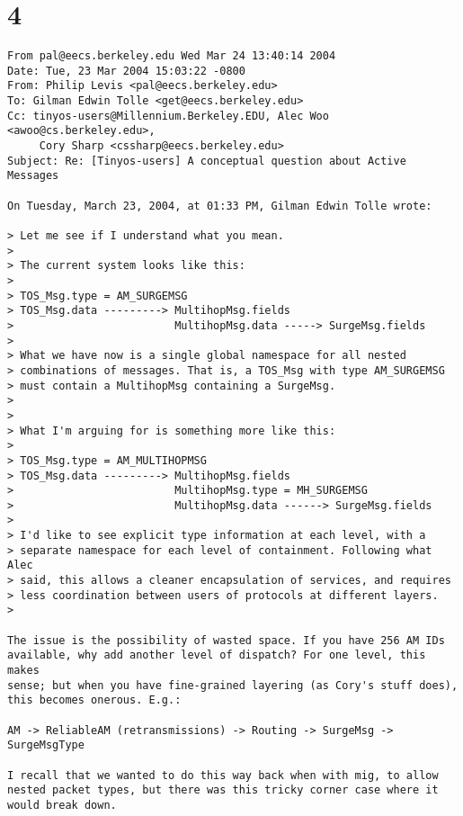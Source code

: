 \documentclass[10pt]{article}
\begin{document}
\section*{4}

\begin{verbatim}
From pal@eecs.berkeley.edu Wed Mar 24 13:40:14 2004
Date: Tue, 23 Mar 2004 15:03:22 -0800
From: Philip Levis <pal@eecs.berkeley.edu>
To: Gilman Edwin Tolle <get@eecs.berkeley.edu>
Cc: tinyos-users@Millennium.Berkeley.EDU, Alec Woo <awoo@cs.berkeley.edu>,
     Cory Sharp <cssharp@eecs.berkeley.edu>
Subject: Re: [Tinyos-users] A conceptual question about Active Messages

On Tuesday, March 23, 2004, at 01:33 PM, Gilman Edwin Tolle wrote:

> Let me see if I understand what you mean.
>
> The current system looks like this:
>
> TOS_Msg.type = AM_SURGEMSG
> TOS_Msg.data ---------> MultihopMsg.fields
>                         MultihopMsg.data -----> SurgeMsg.fields
>
> What we have now is a single global namespace for all nested 
> combinations of messages. That is, a TOS_Msg with type AM_SURGEMSG 
> must contain a MultihopMsg containing a SurgeMsg.
>
>
> What I'm arguing for is something more like this:
>
> TOS_Msg.type = AM_MULTIHOPMSG
> TOS_Msg.data ---------> MultihopMsg.fields
>                         MultihopMsg.type = MH_SURGEMSG
>                         MultihopMsg.data ------> SurgeMsg.fields
>
> I'd like to see explicit type information at each level, with a 
> separate namespace for each level of containment. Following what Alec 
> said, this allows a cleaner encapsulation of services, and requires 
> less coordination between users of protocols at different layers.
>

The issue is the possibility of wasted space. If you have 256 AM IDs 
available, why add another level of dispatch? For one level, this makes 
sense; but when you have fine-grained layering (as Cory's stuff does), 
this becomes onerous. E.g.:

AM -> ReliableAM (retransmissions) -> Routing -> SurgeMsg -> 
SurgeMsgType

I recall that we wanted to do this way back when with mig, to allow 
nested packet types, but there was this tricky corner case where it 
would break down.



\end{verbatim}
\end{document}
